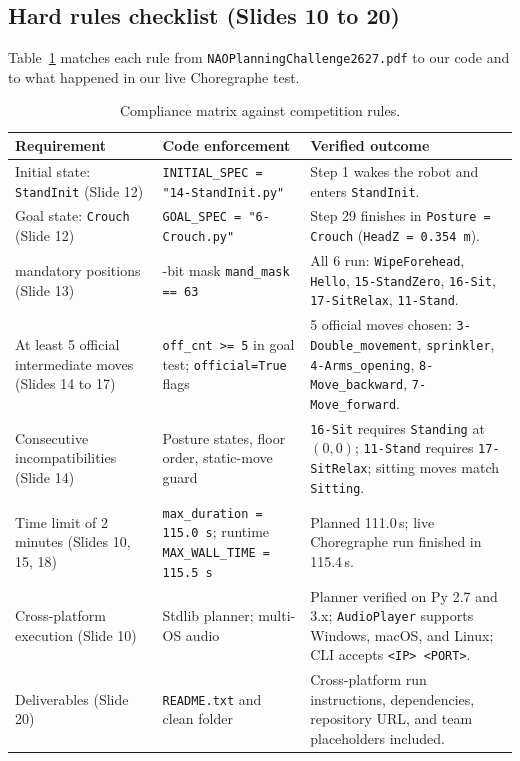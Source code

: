 \documentclass[11pt,a4paper]{article}
\newcommand{\code}[1]{\texttt{#1}}
\begin{document}
\subsection{Hard rules checklist (Slides 10 to 20)}

Table~\ref{tab:rules} matches each rule from \code{NAOPlanningChallenge2627.pdf} to our code and to what happened in our live Choregraphe test.

\begin{table}[H]
  \centering
  \small
  \caption{Compliance matrix against competition rules.}
  \label{tab:rules}
  \begin{tabularx}{\textwidth}{>{\raggedright\arraybackslash}p{3.4cm} >{\raggedright\arraybackslash}p{4.2cm} X}
    \toprule
    \textbf{Requirement} & \textbf{Code enforcement} & \textbf{Verified outcome} \\
    \midrule
    Initial state: \code{StandInit} (Slide 12) & \code{INITIAL\_SPEC = "14-StandInit.py"} & Step 1 wakes the robot and enters \code{StandInit}. \\
    Goal state: \code{Crouch} (Slide 12) & \code{GOAL\_SPEC = "6-Crouch.py"} & Step 29 finishes in \code{Posture = Crouch} (\code{HeadZ = 0.354\,m}). \\
    6 mandatory positions (Slide 13) & 6-bit mask \code{mand\_mask == 63} & All 6 run: \code{WipeForehead}, \code{Hello}, \code{15-StandZero}, \code{16-Sit}, \code{17-SitRelax}, \code{11-Stand}. \\
    At least 5 official intermediate moves (Slides 14 to 17) & \code{off\_cnt >= 5} in goal test; \code{official=True} flags & 5 official moves chosen: \code{3-Double\_movement}, \code{sprinkler}, \code{4-Arms\_opening}, \code{8-Move\_backward}, \code{7-Move\_forward}. \\
    Consecutive incompatibilities (Slide 14) & Posture states, floor order, static-move guard & \code{16-Sit} requires \code{Standing} at $(0,0)$; \code{11-Stand} requires \code{17-SitRelax}; sitting moves match \code{Sitting}. \\
    Time limit of 2 minutes (Slides 10, 15, 18) & \code{max\_duration = 115.0\,s}; runtime \code{MAX\_WALL\_TIME = 115.5\,s} & Planned 111.0\,s; live Choregraphe run finished in 115.4\,s. \\
    Cross-platform execution (Slide 10) & Stdlib planner; multi-OS audio & Planner verified on Py 2.7 and 3.x; \code{AudioPlayer} supports Windows, macOS, and Linux; CLI accepts \code{<IP> <PORT>}. \\
    Deliverables (Slide 20) & \code{README.txt} and clean folder & Cross-platform run instructions, dependencies, repository URL, and team placeholders included. \\
    \bottomrule
  \end{tabularx}
\end{table}
\end{document}

